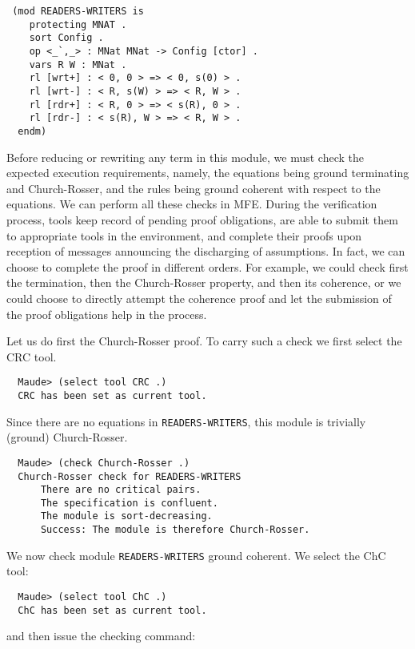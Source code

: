 \begin{small}
\begin{verbatim}
 (mod READERS-WRITERS is
    protecting MNAT .
    sort Config .
    op <_`,_> : MNat MNat -> Config [ctor] .
    vars R W : MNat .
    rl [wrt+] : < 0, 0 > => < 0, s(0) > .
    rl [wrt-] : < R, s(W) > => < R, W > .
    rl [rdr+] : < R, 0 > => < s(R), 0 > .
    rl [rdr-] : < s(R), W > => < R, W > .
  endm)
\end{verbatim}
\end{small}
%
Before reducing or rewriting any term in this module, we must check the expected 
execution requirements, namely, the equations being ground 
terminating and Church-Rosser, and the rules being ground coherent with respect to the equations.
We can perform all these checks in MFE. 
During the verification process, tools keep record of pending proof obligations, 
are able to submit them to appropriate tools in the environment, 
and complete their proofs upon
reception of messages announcing the discharging of assumptions.
In fact, we can choose to complete the proof in different orders. For example, 
we could check first the termination, then the Church-Rosser property, and then
its coherence, or we could choose to directly attempt the coherence proof and let
the submission of the proof obligations help in the process. 

Let us do first the Church-Rosser proof. 
To carry such a check we first select the CRC tool.

\begin{small}
\begin{verbatim}
  Maude> (select tool CRC .)
  CRC has been set as current tool.
\end{verbatim}
\end{small}
%
Since there are no equations in \verb~READERS-WRITERS~, this
module is trivially (ground) Church-Rosser.

\begin{small}
\begin{verbatim}
  Maude> (check Church-Rosser .)
  Church-Rosser check for READERS-WRITERS
      There are no critical pairs.
      The specification is confluent.
      The module is sort-decreasing.
      Success: The module is therefore Church-Rosser.
\end{verbatim}
\end{small}
%
We now check module \verb~READERS-WRITERS~ ground coherent. We select the ChC tool:

\begin{small}
\begin{verbatim}
  Maude> (select tool ChC .)
  ChC has been set as current tool.
\end{verbatim}
\end{small}
%
and then issue the checking command:

